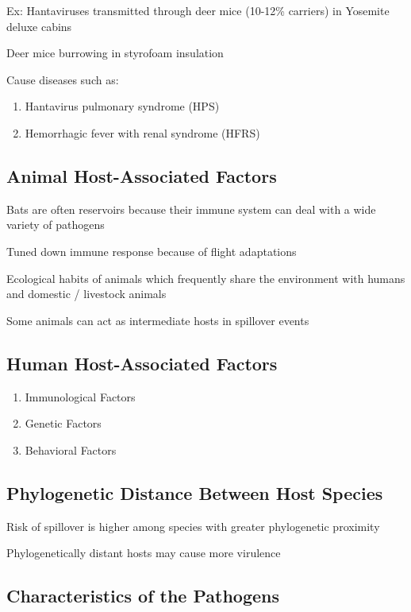 \documentclass{notes}
\begin{document}
Ex: Hantaviruses transmitted through deer mice (10-12\% carriers) in Yosemite deluxe cabins

\tab \indicates Deer mice burrowing in styrofoam insulation

Cause diseases such as:

\begin{enumerate}
    \item Hantavirus pulmonary syndrome (HPS)
    \item Hemorrhagic fever with renal syndrome (HFRS)
\end{enumerate}

\subsection{Animal Host-Associated Factors}

Bats are often reservoirs because their immune system can deal with a wide variety of pathogens

\tab \indicates Tuned down immune response because of flight adaptations

Ecological habits of animals which frequently share the environment with humans and domestic / livestock animals

Some animals can act as intermediate hosts in spillover events

\subsection{Human Host-Associated Factors}

\begin{enumerate}
    \item Immunological Factors
    \item Genetic Factors
    \item Behavioral Factors
\end{enumerate}

\subsection{Phylogenetic Distance Between Host Species}

Risk of spillover is higher among species with greater phylogenetic proximity

Phylogenetically distant hosts may cause more virulence

\subsection{Characteristics of the Pathogens}
\end{document}
